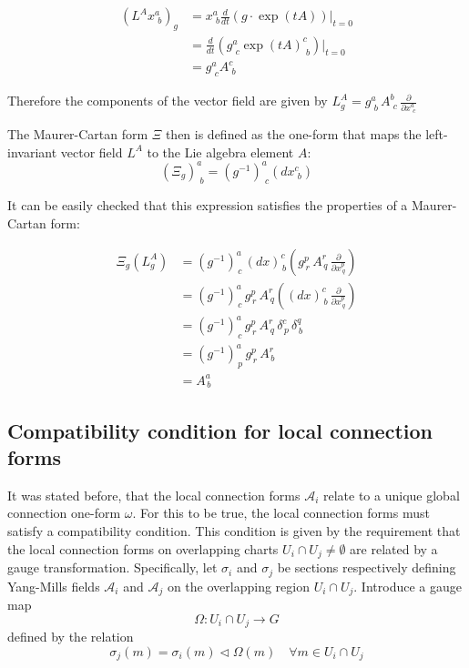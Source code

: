 \begin{align*}
  \left( L^A x^a_{\,\,b} \right)_g &= x^a_{\,\,b} \frac{d}{dt} \left( g \cdot \exp(tA) \right) \bigg|_{t=0} \\
  &= \frac{d}{dt} \left( g^a_{\,\,c} \exp(tA)^c_{\,\,b} \right) \bigg|_{t=0} \\
  &= g^a_{\,\,c} A^c_{\,\,b}
\end{align*}


Therefore the components of the vector field are given by \( L^A_g = g^a_{\,\,b} \, A^b_{\,\,c} \, \frac{\partial}{\partial x^a_{\,\,c}} \)\cite{FredericSchullerLocalrepresentationsconnectionbasemanifoldYangMillsfieldsLec222015}

The Maurer-Cartan form $\Xi$ then is defined as the one-form that maps the left-invariant vector field \( L^A \) to the Lie algebra element \( A \):
\[ (\Xi_g)^a_{\,\,b} = (g^{-1})^a_{\,\,c}(dx^c_{\,\,b}) \]

It can be easily checked that this expression satisfies the properties of a Maurer-Cartan form:

\begin{align*}
  \Xi_g(L^A_g) 
  &= (g^{-1})^a_{\,c} \, (dx)^c_{\,b} \left( g^p_{\,r} \, A^r_{\,q} \, \frac{\partial}{\partial x^p_{\,q}} \right) \\
  &= (g^{-1})^a_{\,c} \, g^p_{\,r} \, A^r_{\,q} \left( (dx)^c_{\,b} \, \frac{\partial}{\partial x^p_{\,q}} \right) \\
  &= (g^{-1})^a_{\,c} \, g^p_{\,r} \, A^r_{\,q} \, \delta^c_{\,p} \, \delta^q_{\,b} \\
  &= (g^{-1})^a_{\,p} \, g^p_{\,r} \, A^r_{\,b} \\
  &= A^a_{\,b}
\end{align*}


\subsection{Compatibility condition for local connection forms}


It was stated before, that the local connection forms $\mathcal{A}_i$ relate to a unique global connection one-form $\omega$. For this to be true, the local connection forms must satisfy a compatibility condition. This condition is given by the requirement that the local connection forms on overlapping charts \( U_i \cap U_j \neq \emptyset\) are related by a gauge transformation\cite{NakaharaGeometrytopologyphysics2005}. Specifically, let $\sigma_i$ and $\sigma_j$ be sections respectively defining Yang-Mills fields \( \mathcal{A}_i \) and \( \mathcal{A}_j \) on the overlapping region \( U_i \cap U_j \). Introduce a gauge map
\[ \Omega : U_i \cap U_j \longrightarrow G \]
defined by the relation
\[ \sigma_j(m) = \sigma_i(m) \triangleleft \Omega(m) \quad \forall m \in U_i \cap U_j \]


